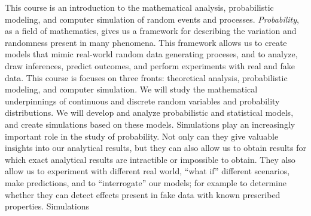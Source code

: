 This course is an introduction to the mathematical analysis, probabilistic modeling, and computer simulation of random events and processes. 
{\it Probability}, as a field of mathematics, gives us a framework for describing the variation and randomness present in many phenomena. This framework allows us to create models that mimic real-world random data generating proceses, and to analyze, draw inferences, predict outcomes, and perform experiments with real and fake data.  
This course is focuses on three fronts: theoretical analysis, probabilistic modeling, and computer simulation.
We will study the mathematical underpinnings of continuous and discrete random variables and probability distributions. We will develop and analyze probabilistic and statistical models, and create simulations based on these models.
Simulations play an increasingly important role in the study of probability.  Not only can they give valuable insights into our analytical results, but they can also allow us to obtain results for which exact analytical results are intractible or impossible to obtain. They also allow us  to experiment with different  real world, ``what if'' different scenarios, make predictions, and to ``interrogate'' our models; for example to determine whether they can detect effects present in fake data with known prescribed properties. Simulations